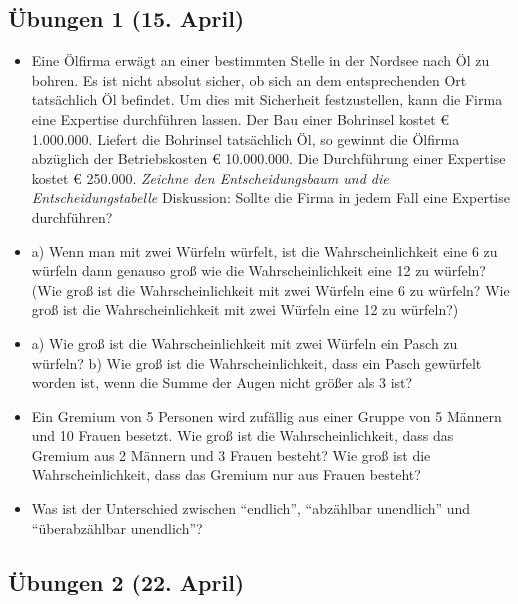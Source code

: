 \newpage
\subsection{Übungen 1 (15. April)}

\begin{itemize}
 \item Eine Ölfirma erwägt an einer bestimmten Stelle in der Nordsee nach Öl zu
 bohren. Es ist nicht absolut sicher, ob sich an dem entsprechenden Ort
 tatsächlich Öl befindet. Um dies mit Sicherheit festzustellen, kann die Firma
 eine Expertise durchführen lassen. Der Bau einer Bohrinsel
 kostet € 1.000.000. Liefert die Bohrinsel tatsächlich Öl, so gewinnt die
 Ölfirma abzüglich der Betriebskosten € 10.000.000. Die Durchführung einer
 Expertise kostet € 250.000. {\em Zeichne den Entscheidungsbaum und die
 Entscheidungstabelle} Diskussion: Sollte die Firma in jedem Fall eine Expertise
 durchführen?

 \item a) Wenn man mit zwei Würfeln würfelt, 
 ist die Wahrscheinlichkeit eine 6 zu würfeln dann genauso groß wie die 
 Wahrscheinlichkeit eine 12 zu würfeln? (Wie groß ist die Wahrscheinlichkeit mit zwei
 Würfeln eine 6 zu würfeln? Wie groß ist die Wahrscheinlichkeit mit zwei
 Würfeln eine 12 zu würfeln?)

\item a) Wie groß ist die Wahrscheinlichkeit
mit zwei Würfeln ein Pasch zu würfeln? b) Wie groß ist die Wahrscheinlichkeit,
dass ein Pasch gewürfelt worden ist, wenn die Summe der Augen nicht größer als
3 ist?

\item Ein Gremium von 5 Personen wird zufällig aus einer Gruppe von 5 Männern
und 10 Frauen besetzt. Wie groß ist die Wahrscheinlichkeit, dass das Gremium aus 2
Männern und 3 Frauen besteht? Wie groß ist die Wahrscheinlichkeit, dass das
Gremium nur aus Frauen besteht?

\item Was ist der Unterschied zwischen "`endlich"', "`abzählbar unendlich"' und
"`überabzählbar unendlich"'?

\end{itemize}


\subsection{Übungen 2 (22. April)}

